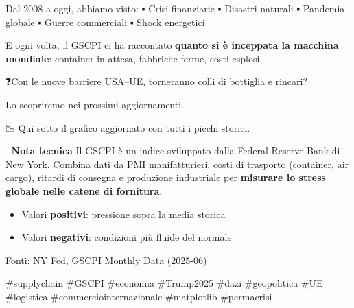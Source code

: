 \documentclass[
  11pt,
  letterpaper,
  DIV=11,
  numbers=noendperiod]{scrartcl}
\providecommand{\tightlist}{%
  \setlength{\itemsep}{0pt}\setlength{\parskip}{0pt}}
\begin{document}
Dal 2008 a oggi, abbiamo visto: ▪️ Crisi finanziarie ▪️ Disastri
naturali ▪️ Pandemia globale ▪️ Guerre commerciali ▪️ Shock energetici

E ogni volta, il GSCPI ci ha raccontato \textbf{quanto si è inceppata la
macchina mondiale}: container in attesa, fabbriche ferme, costi esplosi.

❓Con le nuove barriere USA--UE, torneranno colli di bottiglia e
rincari?

Lo scopriremo nei prossimi aggiornamenti.

📉 Qui sotto il grafico aggiornato con tutti i picchi storici.

📌 \textbf{Nota tecnica} Il GSCPI è un indice sviluppato dalla Federal
Reserve Bank di New York. Combina dati da PMI manifatturieri, costi di
trasporto (container, air cargo), ritardi di consegna e produzione
industriale per \textbf{misurare lo stress globale nelle catene di
fornitura}.

\begin{itemize}
\tightlist
\item
  Valori \textbf{positivi}: pressione sopra la media storica
\item
  Valori \textbf{negativi}: condizioni più fluide del normale
\end{itemize}

Fonti: NY Fed, GSCPI Monthly Data (2025-06)

\#supplychain \#GSCPI \#economia \#Trump2025 \#dazi \#geopolitica \#UE
\#logistica \#commerciointernazionale \#matplotlib \#permacrisi
\end{document}
